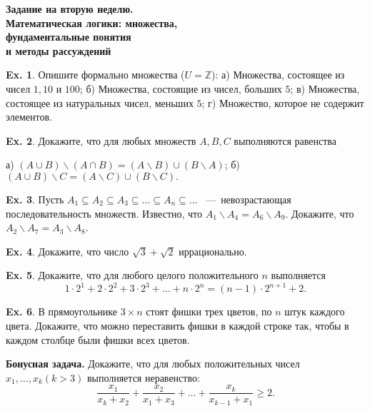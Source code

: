 \documentclass[12pt,a5paper,fleqn]{article}
\theoremstyle{definition}
\newtheorem{Ex}{Ex.}
\begin{document}
\begin{center}
	{\bf \Large Задание на вторую неделю. \\ \normalsize Математическая логики: множества, \\ фундаментальные понятия
	\\и методы рассуждений}
\end{center}
\vspace{0.4cm}

\begin{Ex}
	Опишите формально множества ($U=\mathbb{Z}$): а) Множества, состоящее из чисел $1, 10$ и $100$;
	б) Множества, состоящие из чисел, больших $5$; в) Множества, состоящее из натуральных чисел,
	меньших $5$; г) Множество, которое не содержит элементов.
\end{Ex}

\begin{Ex}
	Докажите, что для любых множеств $A, B, C$ выполняются равенства 
	
	а) $(A\cup B)\backslash(A\cap B) = (A\backslash B)\cup(B\backslash A)$; 
	б) $(A\cup B)\backslash C = (A\backslash C)\cup(B\backslash C).$
\end{Ex}

\begin{Ex}
	Пусть $A_1\subseteq A_2\subseteq A_3\subseteq\ldots\subseteq A_n\subseteq\ldots $
	~---~невозрастающая последовательность множеств. Известно, что $A_1\backslash A_4
	= A_6\backslash A_9$. Докажите, что $A_2\backslash A_7 = A_3 \backslash A_8$.
\end{Ex}

\begin{Ex}
	Докажите, что число $\sqrt{3} + \sqrt{2}$ иррационально.
\end{Ex}

\begin{Ex}
	Докажите, что для любого целого положительного $n$ выполняется
	$$1\cdot 2^1 + 2 \cdot 2^2 + 3 \cdot 2^3 + \ldots + n \cdot 2^n = (n-1)\cdot 2^{n+1}+2.$$
\end{Ex}

\begin{Ex}
	В прямоугольнике $3\times n$ стоят фишки трех цветов, по $n$ штук каждого цвета.
	Докажите, что можно переставить фишки в каждой строке так, чтобы в каждом столбце 
	были фишки всех цветов.
\end{Ex}


\textbf{Бонусная задача.} Докажите, что для любых положительных чисел
$x_1,\ldots,x_k(k>3)$ выполняется неравенство:
$$\frac{x_1}{x_k + x_2} + \frac{x_2}{x_1 + x_3} + \ldots + 
\frac{x_k}{x_{k-1} + x_1}\geqslant 2.$$
\end{document}
